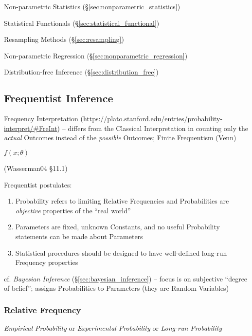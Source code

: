 \fist Non-parametric Statistics (\S\ref{sec:nonparametric_statistics})

Statistical Functionals (\S\ref{sec:statistical_functional})

Resampling Methods (\S\ref{sec:resampling})

Non-parametric Regression (\S\ref{sec:nonparametric_regression})

Distribution-free Inference (\S\ref{sec:distribution_free})



\subsection{Frequentist Inference}\label{sec:frequentist_inference}

Frequency Interpretation
(\url{https://plato.stanford.edu/entries/probability-interpret/#FreInt}) --
differs from the Classical Interpretation in counting only the \emph{actual}
Outcomes instead of the \emph{possible} Outcomes; Finite Frequentism (Venn)

$f(x; \theta)$

(Wasserman04 \S11.1)

Frequentist postulates:
\begin{enumerate}
  \item Probability refers to limiting Relative Frequencies and Probabilities
    are \emph{objective} properties of the ``real world''
  \item Parameters are fixed, unknown Constants, and no useful Probability
    statements can be made about Parameters
  \item Statistical procedures should be designed to have well-defined long-run
    Frequency properties
\end{enumerate}

cf. \emph{Bayesian Inference} (\S\ref{sec:bayesian_inference}) -- focus is on
subjective ``degree of belief''; assigns Probabilities to Parameters (they are
Random Variables)



\subsubsection{Relative Frequency}\label{sec:relative_frequency}

\emph{Empirical Probability} or \emph{Experimental Probability} or
\emph{Long-run Probability}

